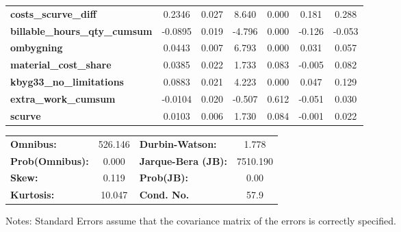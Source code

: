 \begin{center}
\begin{tabular}{lcccccc}
\textbf{costs\_scurve\_diff}             &       0.2346  &        0.027     &     8.640  &         0.000        &        0.181    &        0.288     \\
\textbf{billable\_hours\_qty\_cumsum}    &      -0.0895  &        0.019     &    -4.796  &         0.000        &       -0.126    &       -0.053     \\
\textbf{ombygning}                       &       0.0443  &        0.007     &     6.793  &         0.000        &        0.031    &        0.057     \\
\textbf{material\_cost\_share}           &       0.0385  &        0.022     &     1.733  &         0.083        &       -0.005    &        0.082     \\
\textbf{kbyg33\_no\_limitations}         &       0.0883  &        0.021     &     4.223  &         0.000        &        0.047    &        0.129     \\
\textbf{extra\_work\_cumsum}             &      -0.0104  &        0.020     &    -0.507  &         0.612        &       -0.051    &        0.030     \\
\textbf{scurve}                          &       0.0103  &        0.006     &     1.730  &         0.084        &       -0.001    &        0.022     \\
\bottomrule
\end{tabular}
\begin{tabular}{lclc}
\textbf{Omnibus:}       & 526.146 & \textbf{  Durbin-Watson:     } &    1.778  \\
\textbf{Prob(Omnibus):} &   0.000 & \textbf{  Jarque-Bera (JB):  } & 7510.190  \\
\textbf{Skew:}          &   0.119 & \textbf{  Prob(JB):          } &     0.00  \\
\textbf{Kurtosis:}      &  10.047 & \textbf{  Cond. No.          } &     57.9  \\
\bottomrule
\end{tabular}
\end{center}

Notes: \newline
 [1] Standard Errors assume that the covariance matrix of the errors is correctly specified.